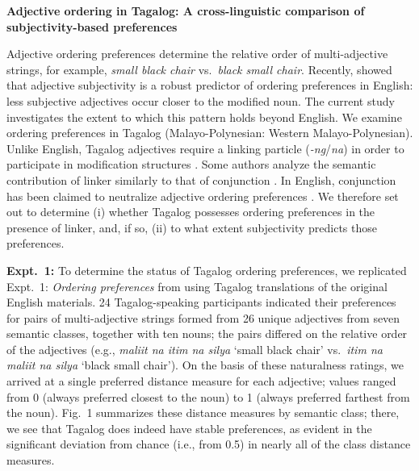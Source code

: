 \documentclass[10pt]{article}
\begin{document}

\begin{center}
	\textbf{Adjective ordering in Tagalog: A cross-linguistic comparison of subjectivity-based preferences}
\end{center}
Adjective ordering preferences determine the relative order of multi-adjective strings, for example, \emph{small black chair} vs.~\emph{black small chair}. Recently, \cite{scontrasetal2017adjectives} showed that adjective subjectivity is a robust predictor of ordering preferences in English: less subjective adjectives occur closer to the modified noun. The current study investigates the extent to which this pattern holds beyond English. We examine ordering preferences in Tagalog (Malayo-Polynesian: Western Malayo-Polynesian). Unlike English, Tagalog adjectives require a linking particle (\emph{-ng}/\emph{na}) in order to participate in modification structures \citep{foley1975,rubin1994}. Some authors analyze the semantic contribution of linker similarly to that of conjunction \citep{rubin1994,scontrasnicolae2014}. In English, conjunction has been claimed to neutralize adjective ordering preferences \citep{fordolson1975,byrne1979}. We therefore set out to determine (i) whether Tagalog possesses ordering preferences in the presence of linker, and, if so, (ii) to what extent subjectivity predicts those preferences.

\textbf{Expt.~1:} To determine the status of Tagalog ordering preferences, we replicated Expt.~1: \emph{Ordering preferences} from \citeauthor{scontrasetal2017adjectives} using Tagalog translations of the original English materials. 24 Tagalog-speaking participants indicated their preferences for pairs of multi-adjective strings formed from 26 unique adjectives from seven semantic classes, together with ten nouns; the pairs differed on the relative order of the adjectives (e.g., \emph{maliit na itim na silya} `small black chair' vs.~\emph{itim na maliit na silya} `black small chair'). On the basis of these naturalness ratings, we arrived at a single preferred distance measure for each adjective; values ranged from 0 (always preferred closest to the noun) to 1 (always preferred farthest from the noun). Fig.~1 summarizes these distance measures by semantic class; there, we see that Tagalog does indeed have stable preferences, as evident in the significant deviation from chance (i.e., from 0.5) in nearly all of the class distance measures.
\end{document}
